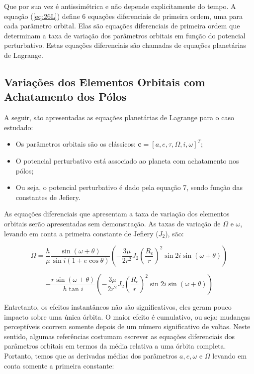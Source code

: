 \par Que por sua vez é antissimétrica e não depende explicitamente do tempo. A equação (\ref{eq:26L}) define 6 equações diferenciais de primeira ordem, uma para cada parâmetro orbital. Elas são equações diferenciais de primeira ordem que determinam a taxa de variação dos parâmetros orbitais em função do potencial perturbativo. Estas equações diferenciais são chamadas de equações planetárias de Lagrange.

\subsection{Variações dos Elementos Orbitais com Achatamento dos Pólos}

\par A seguir, são apresentadas as equações planetárias de Lagrange para o caso estudado:

\begin{itemize}
    \item Os parâmetros orbitais são os clássicos: $\mathbf{c} = [a, e, \tau, \Omega, i, \omega]^T$;
    \item O potencial perturbativo está associado ao planeta com achatamento nos pólos;
    \item Ou seja, o potencial perturbativo é dado pela equação 7, sendo função das constantes de Jefiery.
\end{itemize}

\par As equações diferenciais que apresentam a taxa de variação dos elementos orbitais serão apresentadas sem demonstração.
As taxas de variação de $\Omega$ e $\omega$, levando em conta a primeira constante de Jefiery ($J_2$), são:

\begin{equation}
\dot\Omega = \frac{h}{\mu}\frac{\sin(\omega+\theta)}{\sin i(1+e\cos\theta)}\left(-\frac{3\mu}{2r^2}J_2\left(\frac{R_e}{r}\right)^2\sin2i\sin(\omega+\theta)\right)
\label{eq:27L}
\end{equation}

\begin{equation}
-\frac{r\sin(\omega+\theta)}{h\tan i}\left(-\frac{3\mu}{2r^2}J_2\left(\frac{R_e}{r}\right)^2\sin2i\sin(\omega+\theta)\right)
\label{eq:28L}
\end{equation}

\par Entretanto, os efeitos instantâneos não são significativos, eles geram pouco impacto sobre uma única órbita. O maior efeito é cumulativo, ou seja: mudanças perceptíveis ocorrem somente depois de
um número significativo de voltas. Neste sentido, algumas referências costumam escrever as equações diferenciais dos parâmetros orbitais em termos da média relativa a uma órbita completa. Portanto, temos que as derivadas médias dos parâmetros $a,e,\omega$ e $\Omega$ levando em conta somente a primeira constante: 

